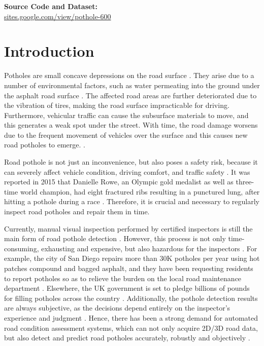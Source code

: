 \documentclass[runningheads]{llncs}
\begin{document}
\begin{center}
    \textbf{Source Code and Dataset:}\\
    \url{sites.google.com/view/pothole-600}
\end{center}


\section{Introduction}
\label{sec.introduction}
Potholes are small concave depressions on the road surface \cite{mathavan2015review}. They arise due to a number of environmental factors, such as water permeating into the ground under the asphalt road surface \cite{fan2019pothole}. The affected road areas are further deteriorated due to the vibration of tires, making the road surface impracticable for driving. Furthermore, vehicular traffic can cause the subsurface materials to move, and this generates a weak spot under the street. With time, the road damage worsens due to the frequent movement of vehicles over the surface and this causes new road potholes to emerge. \cite{koch2015review}.

Road pothole is not just an inconvenience, but also poses a safety risk, because it can severely affect vehicle condition, driving comfort, and traffic safety \cite{fan2019pothole}. It was reported in 2015 that Danielle Rowe, an Olympic gold medalist as well as three-time world champion, had eight fractured ribs resulting in a punctured lung, after hitting a pothole during a race \cite{pothole_news_dani_king}. Therefore, it is crucial and necessary to regularly inspect road potholes and repair them in time.

Currently, manual visual inspection performed by certified inspectors is still the main form of road pothole detection \cite{fan2019road}. However, this process is not only time-consuming, exhausting and expensive, but also hazardous for the inspectors \cite{koch2015review}. For example, the city of San Diego repairs more than 30K potholes per year using hot patches compound and bagged asphalt, and they have been requesting residents to report potholes so as to relieve the burden on the local road maintenance department \cite{sandiego_pothole}. Elsewhere, the UK government is set to pledge billions of pounds for filling potholes across the country \cite{bbc_pothole_repairing}. Additionally, the pothole detection results are always subjective, as the decisions depend entirely on the inspector's experience and judgment \cite{fan2019real}. Hence, there has been a strong demand for automated road condition assessment systems, which can not only acquire 2D/3D road data, but also detect and predict road potholes accurately, robustly and objectively \cite{leo2018deep}.
\end{document}
